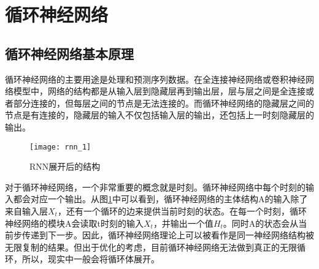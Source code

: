 %




\section{循环神经网络}
\subsection{循环神经网络基本原理}

循环神经网络的主要用途是处理和预测序列数据。在全连接神经网络或卷积神经网络模型中，网络的结构都是从输入层到隐藏层再到输出层，层与层之间是全连接或者部分连接的，但每层之间的节点是无法连接的。而循环神经网络的隐藏层之间的节点是有连接的，隐藏层的输入不仅包括输入层的输出，还包括上一时刻隐藏层的输出。

\begin{figure}[htp]
\centering
\texttt{[image: rnn\_1]}
\caption{RNN展开后的结构}
\label{fig:rnn_1}
\end{figure}
对于循环神经网络，一个非常重要的概念就是时刻。循环神经网络中每个时刻的输入都会对应一个输出。从图\ref{fig:rnn_1}中可以看到，循环神经网络的主体结构A的输入除了来自输入层$X_t$，还有一个循环的边来提供当前时刻的状态。在每一个时刻，循环神经网络的模块A会读取t时刻的输入$X_t$，并输出一个值$H_t$。同时A的状态会从当前步传递到下一步。因此，循环神经网络理论上可以被看作是同一神经网络结构被无限复制的结果。但出于优化的考虑，目前循环神经网络无法做到真正的无限循环，所以，现实中一般会将循环体展开。

